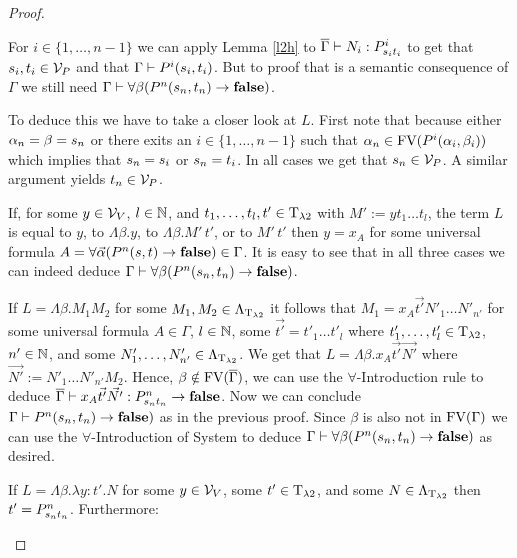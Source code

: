 \begin{proof}
\begin{itemize}
		\begin{figure}[H]
			\centering
			
		\end{figure}
		
		For $i\in\{1,\dots,n-1\}$ we can apply Lemma \ref{l2h} to $\trans{\Gamma}\lambdaModels N_i:\code{P^i}{\predTFst[i]}{\predTSnd[i]}$ to get that $\predTFst[i],\predTSnd[i]\in\VarP$ and that $\Gamma\PModels P^i(\predTFst[i],\predTSnd[i])$. But to proof that \false{} is a semantic consequence of $\Gamma$ we still need $\Gamma\PModels\forall\beta(P^n(\predTFst[n],\predTSnd[n])\to\false)$.
		
		To deduce this we have to take a closer look at $L$. First note that because either $\predFst[n]=\beta=\predTFst[n]$ or there exits an $i\in\{1,\dots,n-1\}$ such that $\predFst[n]\in\FV(P^i(\predFst[i],\predSnd[i]))$ which implies that $\predTFst[n]=\predTFst[i]$ or $\predTFst[n]=\predTSnd[i]$. In all cases we get that $\predTFst[n]\in\VarP$. A similar argument yields $\predTSnd[n]\in\VarP$.
		
		If, for some $y\in\mathcal{V}_V$, $l\in\mathbb{N}$, and $t_1,\dots,t_l,t'\in\text{T}_{\lambda2}$ with $M':=yt_1\dots t_l$, the term $L$ is equal to $y$, to $\Lambda\beta.y$, to $\Lambda\beta.M'\,t'$, or to $M'\,t'$ then $y=x_A$ for some universal formula $A=\forall\vec{\alpha}(P^n(\predTFst,\predTSnd)\to\false)\in\Gamma$. It is easy to see that in all three cases we can indeed deduce $\Gamma\PModels\forall\beta(P^n(\predTFst[n],\predTSnd[n])\to\false)$.
		
		If $L=\Lambda\beta.M_1M_2$ for some $M_1,M_2\in\Lambda_{\text{T}_{\lambda2}}$ it follows that $M_1=x_A\vec{t'}N'_1\dots N'_{n'}$ for some universal formula $A\in\Gamma$, $l\in\mathbb{N}$, some $\vec{t'}=t'_1\dots t'_l$ where $t'_1,\dots,t'_l\in\text{T}_{\lambda2}$, $n'\in\mathbb{N}$, and some $N'_1,\dots,N'_{n'}\in\Lambda_{\text{T}_{\lambda2}}$. We get that $L=\Lambda\beta.x_A\vec{t'}\vec{N'}$ where $\vec{N'}:=N'_1\dots N'_{n'}M_2$. Hence,  $\beta\notin\text{FV}(\overline{\Gamma})$, we can use the $\forall$-Introduction rule to deduce $\trans{\Gamma}\lambdaModels x_A\vec{t'}\vec{N'}:\code{P^n}{\predTFst[n]}{\predTSnd[n]}\to\false$. Now we can conclude $\Gamma\PModels P^n(\predTFst[n],\predTSnd[n])\to\false)$ as in the previous proof. %
		Since $\beta$ is also not in $\text{FV}(\Gamma)$ we can use the $\forall$-Introduction of System \SysP{} to deduce $\Gamma\PModels\forall\beta(P^n(\predTFst[n],\predTSnd[n])\to\false)$ as desired.
		
		If $L=\Lambda\beta.\lambda y:t'.N$ for some $y\in\mathcal{V}_V$, some $t'\in\text{T}_{\lambda2}$, and some $N\in\Lambda_{\text{T}_{\lambda2}}$ then $t'=\code{P^n}{\predTFst[n]}{\predTSnd[n]}$. Furthermore:
		

\end{itemize}
\end{proof}
